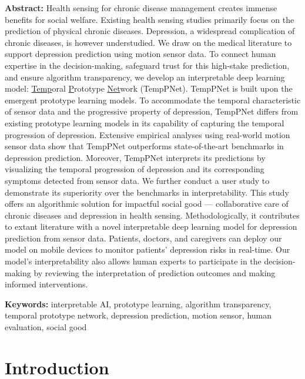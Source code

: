 \documentclass[mnsc]{informs3b} %
\begin{document}
\noindent \textbf{Abstract:} Health sensing for chronic disease management creates immense benefits for social welfare. Existing health sensing studies primarily focus on the prediction of physical chronic diseases. Depression, a widespread complication of chronic diseases, is however understudied. 
We draw on the medical literature to support depression prediction using motion sensor data. 
To connect human expertise in the decision-making, safeguard trust for this high-stake prediction, and ensure algorithm transparency, we develop an interpretable deep learning model: \underline{Temp}oral \underline{P}rototype \underline{Net}work (TempPNet). 
TempPNet is built upon the emergent prototype learning models.
To accommodate the temporal characteristic of sensor data and the progressive property of depression, TempPNet differs from existing prototype learning models in its capability of capturing the temporal progression of depression. 
Extensive empirical analyses using real-world motion sensor data show that TempPNet outperforms state-of-the-art benchmarks in depression prediction. Moreover, TempPNet interprets its predictions by visualizing the temporal progression of depression and its corresponding symptoms detected from sensor data.  
We further conduct a user study to demonstrate its superiority over the benchmarks in interpretability.
This study offers an algorithmic solution for impactful social good — collaborative care of chronic diseases and depression in health sensing. Methodologically, it contributes to extant literature with a novel interpretable deep learning model for depression prediction from sensor data.
Patients, doctors, and caregivers can deploy our model on mobile devices to monitor patients’ depression risks in real-time. Our model's interpretability also allows human experts to participate in the decision-making by reviewing the interpretation of prediction outcomes and making informed interventions. 

\hspace{0.1cm} 

\noindent \textbf{Keywords:} interpretable AI, prototype learning, algorithm transparency, temporal prototype network, depression prediction, motion sensor, human evaluation, social good

\hspace{1cm} 




\section{Introduction}
\label{sec:intro}
\end{document}
